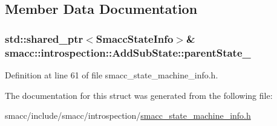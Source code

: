 \subsection{Member Data Documentation}
\subsubsection[{\texorpdfstring{parent\+State\+\_\+}{parentState_}}]{\setlength{\rightskip}{0pt plus 5cm}std\+::shared\+\_\+ptr$<${\bf Smacc\+State\+Info}$>$\& smacc\+::introspection\+::\+Add\+Sub\+State\+::parent\+State\+\_\+}\hypertarget{structsmacc_1_1introspection_1_1AddSubState_a17bd7a0edd62758b94907ecc3644cd29}{}\label{structsmacc_1_1introspection_1_1AddSubState_a17bd7a0edd62758b94907ecc3644cd29}


Definition at line 61 of file smacc\+\_\+state\+\_\+machine\+\_\+info.\+h.



The documentation for this struct was generated from the following file\+:\begin{DoxyCompactItemize}
\item 
smacc/include/smacc/introspection/\hyperlink{smacc__state__machine__info_8h}{smacc\+\_\+state\+\_\+machine\+\_\+info.\+h}\end{DoxyCompactItemize}
